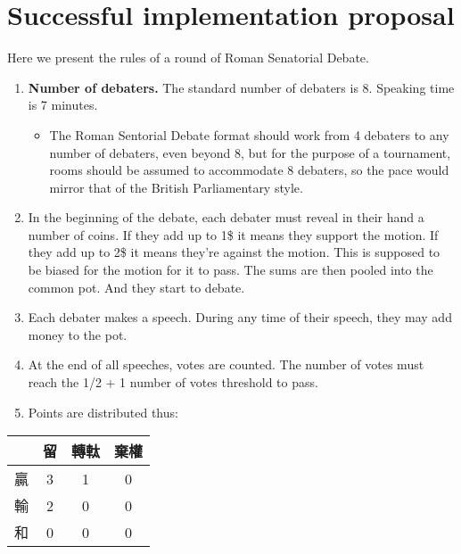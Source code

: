 \section{Successful implementation proposal}

Here we present the rules of a round of Roman Senatorial Debate.

\begin{enumerate}
    \item  \textbf{Number of debaters.} The standard number of debaters is 8. Speaking time is 7 minutes.

    \begin{itemize}
        \item The Roman Sentorial Debate format should work from 4 debaters to any number of debaters, even beyond 8, but for the purpose of a tournament, rooms should be assumed to accommodate 8 debaters, so the pace would mirror that of the British Parliamentary style.  
    \end{itemize}
    \item In the beginning of the debate, each debater must reveal in their hand a number of coins. If they add up to 1\$ it means they support the motion. If they add up to 2\$ it means they're against the motion. This is supposed to be biased for the motion for it to pass. The sums are then pooled into the common pot. And they start to debate.
    \item Each debater makes a speech. During any time of their speech, they may add money to the pot.
    \item At the end of all speeches, votes are counted. The number of votes must reach the 1/2 + 1 number of votes threshold to pass.
    \item Points are distributed thus:
\end{enumerate}

\begin{table}[h]
\centering
\begin{tabular}{l|ccc}
\toprule
 & 留 & 轉軚 & 棄權 \\
\midrule
贏 & 3 & 1 & 0 \\
輸 & 2 & 0 & 0 \\
和 & 0 & 0 & 0 \\
\bottomrule
\end{tabular}
\end{table}

